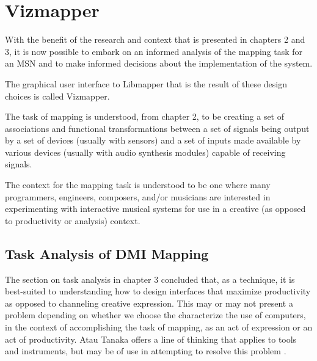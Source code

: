 \resetdatestamp

\chapter{Vizmapper}

With the benefit of the research and context that is presented in chapters 2 and 3, it is now possible to embark on an informed analysis of the mapping task for an MSN and to make informed decisions about the implementation of the system.

The graphical user interface to Libmapper that is the result of these design choices is called Vizmapper.

The task of mapping is understood, from chapter 2, to be creating a set of associations and functional transformations between a set of signals being output by a set of devices (usually with sensors) and a set of inputs made available by various devices (usually with audio synthesis modules)  capable of receiving signals.

The context for the mapping task is understood to be one where many programmers, engineers, composers, and/or musicians are interested in experimenting with interactive musical systems for use in a creative (as opposed to productivity or analysis) context.

\section{Task Analysis of DMI Mapping}

The section on task analysis in chapter 3 concluded that, as a technique, it is best-suited to understanding how to design interfaces that maximize productivity as opposed to channeling creative expression. This may or may not present a problem depending on whether we choose the characterize the use of computers, in the context of accomplishing the task of mapping, as an act of expression or an act of productivity. Atau Tanaka offers a line of thinking that applies to tools and instruments, but may be of use in attempting to resolve this problem \cite{tanaka2000}.

